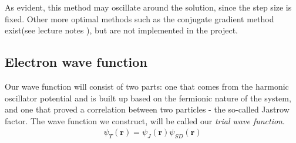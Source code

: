 \documentclass[11pt]{article}
\begin{document}
As evident, this method may oscillate around the solution, since the step size is fixed. Other more optimal methods such as the conjugate gradient method exist(see lecture notes \cite{komp2015}), but are not implemented in the project.


\subsection{Electron wave function}
Our wave function will consist of two parts: one that comes from the harmonic oscillator potential and is built up based on the fermionic nature of the system, and one that proved a correlation between two particles - the so-called Jastrow factor. The wave function we construct, will be called our \textit{trial wave function}.
\begin{align}
	\psi_T(\mathbf{r}) = \psi_J(\mathbf{r})\psi_{SD}(\mathbf{r})
	\label{eq:WF_trial}
\end{align}
\end{document}
